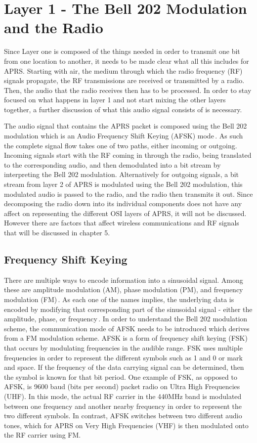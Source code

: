 \section{Layer 1 - The Bell 202 Modulation and the Radio}
Since Layer one is composed of the things needed in order to transmit one bit from one location to another, it needs to be made clear what all this includes for APRS. Starting with air, the medium through which the radio frequency (RF) signals propagate, the RF transmissions are received or transmitted by a radio. Then, the audio that the radio receives then has to be processed. In order to stay focused on what happens in layer 1 and not start mixing the other layers together, a further discussion of what this audio signal consists of is necessary.

The audio signal that contains the APRS packet is composed using the Bell 202 modulation which is an Audio Frequency Shift Keying (AFSK) mode\,\cite{ITUV23,Goleniewski2006}. As such the complete signal flow takes one of two paths, either incoming or outgoing. Incoming signals start with the RF coming in through the radio, being translated to the corresponding audio, and then demodulated into a bit stream by interpreting the Bell 202 modulation. Alternatively for outgoing signals, a bit stream from layer 2 of APRS is modulated using the Bell 202 modulation, this modulated audio is passed to the radio, and the radio then transmits it out. Since decomposing the radio down into its individual components does not have any affect on representing the different OSI layers of APRS, it will not be discussed. However there are factors that affect wireless communications and RF signals that will be discussed in chapter 5.

\subsection{Frequency Shift Keying}
There are multiple ways to encode information into a sinusoidal signal. Among these are amplitude modulation (AM), phase modulation (PM), and frequency modulation (FM)\,\cite{Goleniewski2006}. As each one of the names implies, the underlying data is encoded by modifying that corresponding part of the sinusoidal signal - either the amplitude, phase, or frequency\,\cite{Instruments2014}. In order to understand the Bell 202 modulation scheme, the communication mode of AFSK needs to be introduced which derives from a FM modulation scheme. AFSK is a form of frequency shift keying (FSK) that occurs by modulating frequencies in the audible range. FSK uses multiple frequencies in order to represent the different symbols such as 1 and 0 or mark and space. If the frequency of the data carrying signal can be determined, then the symbol is known for that bit period. One example of FSK, as opposed to AFSK, is 9600 baud (bits per second) packet radio on Ultra High Frequencies (UHF). In this mode, the actual RF carrier in the 440MHz band is modulated between one frequency and another nearby frequency in order to represent the two different symbols. In contrast, AFSK switches between two different audio tones, which for APRS on Very High Frequencies (VHF) is then modulated onto the RF carrier using FM.


